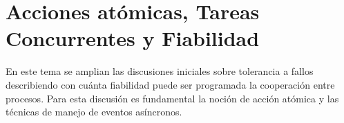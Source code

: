 \section{Acciones atómicas, Tareas Concurrentes y Fiabilidad}

En este tema se amplian las discusiones iniciales sobre tolerancia a fallos
describiendo con cuánta fiabilidad puede ser programada la cooperación entre
procesos. Para esta discusión es fundamental la noción de acción atómica y las
técnicas de manejo de eventos asíncronos.
